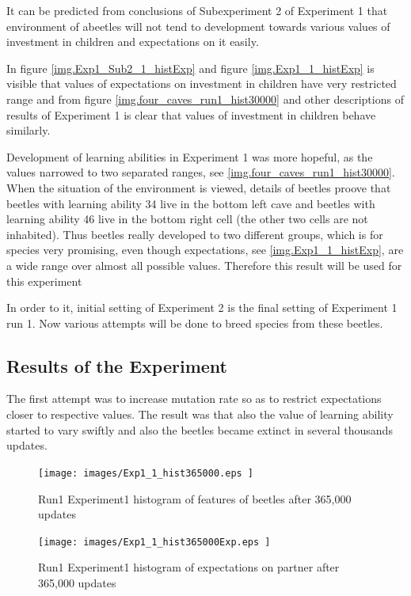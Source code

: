 \documentclass[a4paper,12pt]{report}
\begin{document}
It can be predicted from conclusions of Subexperiment 2 of Experiment 1 that environment of abeetles will not tend to development towards various values of investment in children and expectations on it easily. 

In figure \ref{img.Exp1_Sub2_1_histExp} and figure \ref{img.Exp1_1_histExp} is visible that values of expectations on investment in children have very restricted range and from figure \ref{img.four_caves_run1_hist30000} and other descriptions of results of Experiment 1 is clear that values of investment in children behave similarly.

Development of learning abilities in Experiment 1 was more hopeful, as the values narrowed to two separated ranges, see \ref{img.four_caves_run1_hist30000}. When the situation of the environment is viewed, details of beetles proove that beetles with learning ability 34 live in the bottom left cave and beetles with learning ability 46 live in the bottom right cell (the other two cells are not inhabited). Thus beetles really developed to two different groups, which is for species very promising, even though expectations, see \ref{img.Exp1_1_histExp}, are a wide range over almost all possible values. Therefore this result will be used for this experiment 

In order to it, initial setting of Experiment 2 is the final setting of Experiment 1 run 1. Now various attempts will be done to breed species from these beetles.

\subsection{Results of the Experiment}

The first attempt was to increase mutation rate so as to restrict expectations closer to respective values. The result was that also the value of learning ability started to vary swiftly and also the beetles became extinct in several thousands updates.
 


\begin{figure}
\begin{center}
  \texttt{[image: images/Exp1\_1\_hist365000.eps ]}
  \caption{Run1 Experiment1 histogram of features of beetles after 365,000 updates}
  \label{img.Exp1_1_hist365000}
\end{center}
\end{figure}

\begin{figure}
\begin{center}
  \texttt{[image: images/Exp1\_1\_hist365000Exp.eps ]}
  \caption{Run1 Experiment1 histogram of expectations on partner after 365,000 updates}
  \label{img.Exp1_1_hist365000Exp}
\end{center}
\end{figure}
\end{document}

